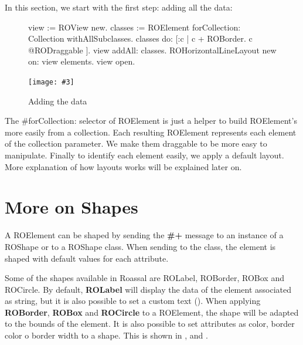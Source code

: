 \documentclass[a4paper,10pt,twoside]{book}
\newcommand{\fig}[4]{
		\begin{figure}[#1]
			\centering
			\texttt{[image: \#3]}
			\caption{\label{fig:#3}#4}
		\end{figure}}
\begin{document}
In this section, we start with the first step: adding all the data:
\begin{figure}[H]
\begin{code}{}
view := ROView new.
classes := ROElement forCollection: Collection withAllSubclasses.
classes 
	do: [:c | c + ROBorder.
			c @RODraggable ].
view addAll: classes.
ROHorizontalLineLayout new on: view elements.
view open.
\end{code}
\end{figure}

\fig{H}{0.6}{hier1}{Adding the data}

The \#forCollection: selector of ROElement is just a helper to build ROElement's more easily from a collection. Each resulting ROElement represents each element of the collection parameter. We make them draggable to be more easy to manipulate.
Finally to identify each element easily, we apply a default layout. More explanation of how layouts works will be explained later on. 

%


\section{More on Shapes} 

A ROElement can be shaped by sending the \textbf{\#+} message to an instance of a ROShape or to a ROShape class. When sending to the class, the element is shaped with default values for each attribute.

Some of the shapes available in Roassal are ROLabel, ROBorder, ROBox and ROCircle. By default, \textbf{ROLabel} will display the data of the element associated as string, but it is also possible to set a custom text (). When applying \textbf{ROBorder}, \textbf{ROBox} and \textbf{ROCircle} to a ROElement, the shape will be adapted to the bounds of the element. It is also possible to set attributes as color, border color o border width to a shape. This is shown in ,  and .
\end{document}
